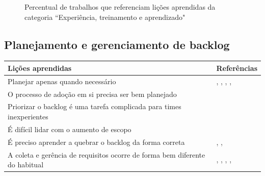 \begin{figure}[H]
	\centering
	\captionsetup{justification=centering}
	\caption{Percentual de trabalhos que referenciam lições aprendidas da categoria ``Experiência, treinamento e aprendizado"}
	\label{fig:exp}
\end{figure}

\subsection{Planejamento e gerenciamento de backlog}

\begin{table}[H]
	\centering
	\begin{tabularx}{\linewidth}{ | X | p{5cm} | } \hline \textbf{Lições aprendidas} & \textbf{Referências} \\ \hline
		Planejar apenas quando necessário & \cite{Hajjdiab2011}, \cite{Fitzgerald2013}, \cite{Piegas2012}, \cite{Hui2013}, \cite{Parzinello2012} \\ \hline
		O processo de adoção em si precisa ser bem planejado & \cite{Hajjdiab2011} \\ \hline
		Priorizar o backlog é uma tarefa complicada para times inexperientes & \cite{Block2011} \\ \hline
		É difícil lidar com o aumento de escopo & \cite{Block2011} \\ \hline
		É preciso aprender a quebrar o backlog da forma correta & \cite{Adobe2012}, \cite{Hui2013}, \cite{Parzinello2012} \\ \hline
		A coleta e gerência de requisitos ocorre de forma bem diferente do habitual & \cite{Bustard2013}, \cite{Korhonen2010}, \cite{Claudia2013}, \cite{Piegas2012}, \cite{Hui2013} \\ \hline
	\end{tabularx}
\end{table}

